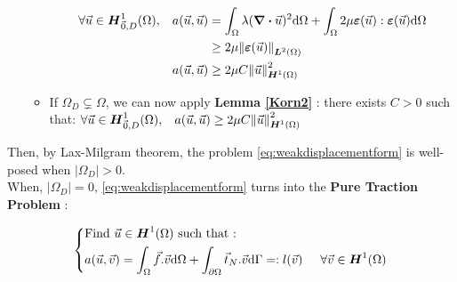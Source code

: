\documentclass[a4paper,12pt,twoside]{report}
\newcommand{\dif}{\mathrm{d}}
\begin{document}
\begin{itemize}
\begin{itemize}
            \begin{equation*}
                \begin{aligned}
                    \forall \vec u \in \boldsymbol H^1_{\vec 0,D}(\Omega), \hspace{0.3cm} a(\vec u, \vec u) 
                    &= \int_\Omega \lambda (\div \vec u)^2 \dif \Omega + \int_\Omega 2\mu \boldsymbol \varepsilon(\vec u): \boldsymbol \varepsilon (\vec u)\dif \Omega \\
                    & \geq 2\mu \norm{\boldsymbol \varepsilon(\vec u)}_{\boldsymbol{L}^2(\Omega)} \\
                    a(\vec u, \vec u) & \geq 2\mu C \norm{\vec u}_{\boldsymbol{H}^1(\Omega)}^2
                \end{aligned}
            \end{equation*}
            \item If $\Omega_D \subsetneq \Omega$, we can now apply \textbf{Lemma \ref{Korn2}} : there exists $C >0$ such that:
            $\forall \vec u \in \boldsymbol H^1_{\vec 0,D}(\Omega), \hspace{0.3cm}a(\vec u, \vec u) \geq 2\mu C \norm{\vec u}_{\boldsymbol{H}^1(\Omega)}^2$
        \end{itemize}
\end{itemize}

Then, by Lax-Milgram theorem, the problem \eqref{eq:weakdisplacementform} is well-posed when $\left| \Omega_D \right| > 0$. \\
When, $\left| \Omega_D \right| = 0$, \eqref{eq:weakdisplacementform} turns into the\textbf{ Pure Traction Problem} : 
\begin{tcolorbox}
\begin{equation}
\label{eq:puretractionproblem}
\left\{
    \begin{aligned}
    &\text{Find } \vec u \in \boldsymbol H^1(\Omega) \text{ such that :}\\
    & a(\vec u,\vec v) = \int_\Omega \vec f . \vec v \dif \Omega + \int_{\partial\Omega} \vec t_N.\vec v \dif \Gamma =:l(\vec v) \hspace{0.5cm} \forall \vec v \in \boldsymbol H^1(\Omega)
    \end{aligned}
\right.
\end{equation}
\end{tcolorbox}
\end{document}
